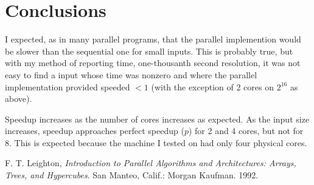 \documentclass[a4paper]{article}
\begin{document}
\section{Conclusions}

I expected, as in many parallel programs, that the parallel implemention would be slower than the sequential one for small inputs. This is probably true, but with my method of reporting time, one-thousanth second resolution, it was not easy to find a input whose time was nonzero and where the parallel implementation provided speeded $<1$ (with the exception of 2 cores on $2^{16}$ as above). 

Speedup increases as the number of cores increases as expected. As the input size increases, speedup approaches perfect speedup ($p$) for 2 and 4 cores, but not for 8. This is expected because the machine I tested on had only four physical cores.


\begin{thebibliography}{9}

  F. T. Leighton,
  \emph{Introduction to Parallel Algorithms and Architectures: Arrays, Trees, and Hypercubes}.
  San Manteo, Calif.: Morgan Kaufman. 1992.

\end{thebibliography}
\end{document}
